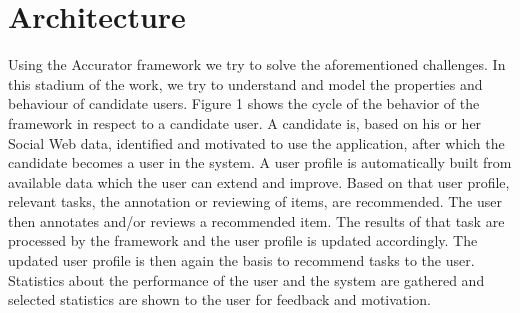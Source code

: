 \section{Architecture}
\label{architecture}


Using the Accurator framework we try to solve the aforementioned challenges. In this stadium of the work, we try to understand and model the properties and behaviour of candidate users. Figure 1 shows the cycle of the behavior of the framework in respect to a candidate user. A candidate is, based on his or her Social Web data, identified and motivated to use the application, after which the candidate becomes a user in the system. A user profile is automatically built from available data which the user can extend and improve. Based on that user profile, relevant tasks, the annotation or reviewing of items, are recommended. The user then annotates and/or reviews a recommended item. The results of that task are processed by the framework and the user profile is updated accordingly. The updated user profile is then again the basis to recommend tasks to the user. Statistics about the performance of the user and the system are gathered and selected statistics are shown to the user for feedback and motivation.